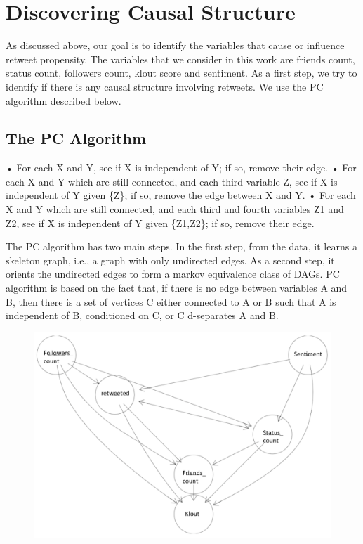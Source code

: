 \section{Discovering Causal Structure}
As discussed above, our goal is to identify the variables that cause or influence retweet propensity. The variables that we consider in this work are friends count, status count, followers count, klout score and sentiment. As a first step, we try to identify if there is any causal structure involving retweets. We use the PC algorithm described below. 
\subsection{The PC Algorithm}

• For each X and Y, see if X is independent of Y; if so, remove their edge.
• For each X and Y which are still connected, and each third variable Z, see if
X is independent of Y given \{Z\}; if so, remove the edge between X and Y.
• For each X and Y which are still connected, and each third and fourth variables
Z1 and Z2, see if X is independent of Y given \{Z1,Z2\}; if so, remove their edge.

The PC algorithm has two main steps. In the first step, from the data, it learns a skeleton graph, i.e., a graph with only undirected edges. As a second step, it orients the undirected edges to form a markov equivalence class of DAGs. PC algorithm is based on the fact that, if there is no edge between variables A and B, then there is a set of vertices C either connected to A or B such that A is independent of B, conditioned on C, or C d-separates A and B. \\
\begin{center}
\begin{figure}
\includegraphics[scale=0.2]{pc}
\end{figure}
\end{center}


